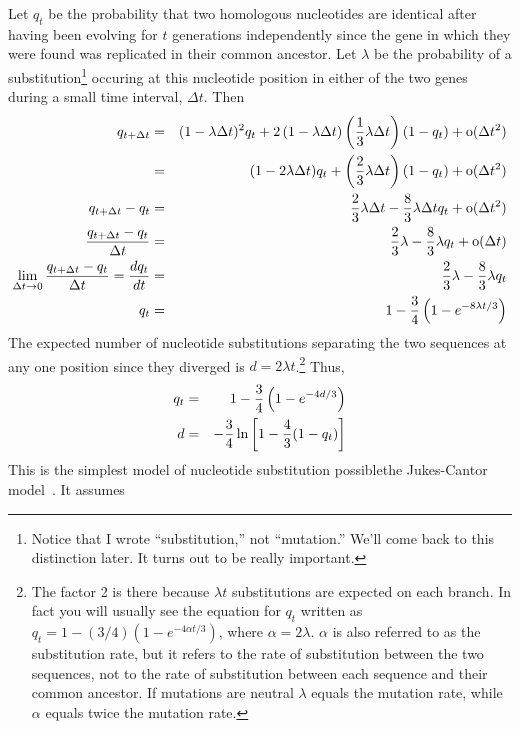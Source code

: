 Let $q_t$ be the probability that two homologous nucleotides are
identical after having been evolving for $t$ generations independently
since the gene in which they were found was replicated in their common
ancestor. Let $\lambda$ be the probability of a
substitution\footnote{Notice that I wrote ``substitution,'' not
  ``mutation.'' We'll come back to this distinction later. It turns
  out to be really important.} occuring
at this nucleotide position in either of the two genes during a small
time interval, $\Delta t$. Then
\begin{eqnarray*}
q_{t+\Delta t} &=& (1 - \lambda\Delta t)^2q_t
                  + 2\left(1 - \lambda\Delta t\right)\left({1 \over
                           3}\lambda\Delta t\right)(1 - q_t)
                  + \hbox{o}(\Delta t^2) \\
               &=& (1 - 2\lambda\Delta t)q_t + \left({2 \over 3}\lambda
                                                    \Delta t\right)
                                              (1 - q_t)
                  + \hbox{o}(\Delta t^2) \\
q_{t+\Delta t} - q_t &=& {2 \over 3}\lambda\Delta t - {8 \over
                           3}\lambda\Delta tq_t + \hbox{o}(\Delta t^2) \\
{q_{t+\Delta t} - q_t \over \Delta t} &=& {2 \over 3}\lambda - {8 \over
3}\lambda q_t + \hbox{o}(\Delta t) \\
\lim_{\Delta t\to 0}{q_{t+\Delta t} - q_t \over \Delta t}  = {dq_t \over dt} &=& {2 \over 3}\lambda - {8
\over 3}\lambda q_t \\
q_t &=& 1 - {3 \over 4}\left(1 - e^{-8\lambda t/3}\right) \\
\end{eqnarray*}
The expected number of nucleotide substitutions separating the two
sequences at any one position since they diverged is $d = 2\lambda
t$.\footnote{The factor 2 is there because $\lambda t$ substitutions
  are expected on each branch. In fact you will usually see the
  equation for $q_t$ written as $q_t = 1 - (3/4)\left(1 - e^{-4\alpha
      t/3}\right)$, where $\alpha = 2\lambda$. $\alpha$ is also
  referred to as the substitution rate, but it refers to the rate of
  substitution between the two sequences, not to the rate of
  substitution between each sequence and their common ancestor. If
  mutations are neutral $\lambda$ equals the mutation rate, while
  $\alpha$ equals twice the mutation rate.} Thus,
\begin{eqnarray*}
q_t &=& 1 - {3 \over 4}\left(1 - e^{-4d/3}\right) \\
d   &=& -{3 \over 4}\ln\left[1 - {4 \over 3}(1 - q_t)\right] \\
\end{eqnarray*}
This is the simplest model of nucleotide substitution
possible{\dash}the Jukes-Cantor model~\cite{Jukes-Cantor-1969}.
It assumes

